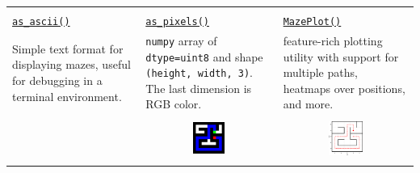 \documentclass[10pt,a4paper,onecolumn]{article}
\let\origfigure\figure
\let\endorigfigure\endfigure
\renewenvironment{figure}[1][2] {
    \expandafter\origfigure\expandafter[H]
} {
    \endorigfigure
}
\begin{document}
\begin{figure}[H]
  \centering
  \begin{tabular}{p{1.5in} p{1.5in} p{1.5in}} 
    \hline \\[.5em]
    \href{https://understanding-search.github.io/maze-dataset/maze_dataset.html\#LatticeMaze.as_ascii}{\texttt{as\_ascii()}}
    & \href{https://understanding-search.github.io/maze-dataset/maze_dataset.html\#LatticeMaze.as_pixels}{\texttt{as\_pixels()}}
    & \href{https://understanding-search.github.io/maze-dataset/maze_dataset/plotting.html\#MazePlot}{\texttt{MazePlot()}} \\[.5em]
      Simple text format for displaying mazes, useful for debugging in a terminal environment.
      & \texttt{numpy} array of \texttt{dtype=uint8} and shape \texttt{(height, width, 3)}. The last dimension is RGB color.
      & feature-rich plotting utility with support for multiple paths, heatmaps over positions, and more. \\[1em]
    \hline \\
      \multicolumn{1}{c}{\begin{minipage}[b]{1.6in}
        \setlength{\baselineskip}{0.9em}
         
      \end{minipage}}
      & \multicolumn{1}{c}{
        \includegraphics[width=0.25\textwidth]{figures/outputs-pixels.pdf}
      }
      & \multicolumn{1}{c}{
        \includegraphics[width=0.27\textwidth, trim={0 0.8cm -.3cm, -.5cm}, clip]{figures/outputs-mazeplot.pdf}
      } \\[1em]
    
    \hline \\
  \end{tabular}
  \caption{Various output formats. Top row (left to right): ASCII diagram, rasterized pixel grid, and advanced display tool.}
  \label{fig:output-fmts}
\end{figure}
\end{document}
